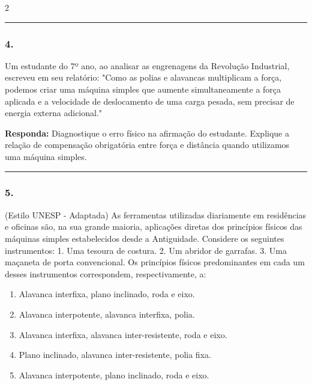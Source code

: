 \documentclass[twoside, 10pt, a4paper]{article}
\newlength{\espacoPreQuestao}
\newlength{\espacoQuestao}
\newlength{\espacoAlt}
\begin{document}
\begin{multicols*}{2}
\noindent\textcolor{CorLinha}{\rule{\linewidth}{0.5pt}}
\par\vspace{\espacoPreQuestao}
\subsubsection*{4.} Um estudante do 7º ano, ao analisar as engrenagens da Revolução Industrial, escreveu em seu relatório: "Como as polias e alavancas multiplicam a força, podemos criar uma máquina simples que aumente simultaneamente a força aplicada e a velocidade de deslocamento de uma carga pesada, sem precisar de energia externa adicional."
\begin{boxresponda}
\textbf{Responda:} Diagnostique o erro físico na afirmação do estudante. Explique a relação de compensação obrigatória entre força e distância quando utilizamos uma máquina simples.
\end{boxresponda}
\par\vspace{\espacoQuestao}

\noindent\textcolor{CorLinha}{\rule{\linewidth}{0.5pt}} 
\par\vspace{\espacoPreQuestao}
\subsubsection*{5.} (Estilo UNESP - Adaptada) As ferramentas utilizadas diariamente em residências e oficinas são, na sua grande maioria, aplicações diretas dos princípios físicos das máquinas simples estabelecidos desde a Antiguidade. Considere os seguintes instrumentos:
1. Uma tesoura de costura.
2. Um abridor de garrafas.
3. Uma maçaneta de porta convencional.
Os princípios físicos predominantes em cada um desses instrumentos correspondem, respectivamente, a:
\begin{enumerate}[label=\alph*), itemsep=\espacoAlt]
    \item Alavanca interfixa, plano inclinado, roda e eixo.
    \item Alavanca interpotente, alavanca interfixa, polia.
    \item Alavanca interfixa, alavanca inter-resistente, roda e eixo.
    \item Plano inclinado, alavanca inter-resistente, polia fixa.
    \item Alavanca interpotente, plano inclinado, roda e eixo.
\end{enumerate}
\par\vspace{\espacoQuestao}


\end{multicols*}
\end{document}
